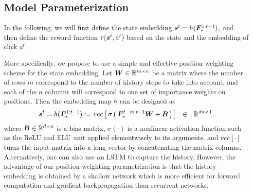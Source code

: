 \documentclass{article} %
\begin{document}
\subsection{Model Parameterization}
\vspace{-3mm}
In the following, we will first define the state embedding ${\bm{s}}^t = h({\bm{F}}^{1:t-1}_\ast)$, and then define the reward function $r({\bm{s}}^t, a^t)$ based on the state and the embedding of click $a^t$. 

More specifically, we propose to use a simple and effective position weighting scheme for the state embedding. Let ${\bm{W}} \in {\mathbb{R}}^{m\times n}$ be a matrix where the number of rows $m$ correspond to the number of history steps to take into account, and each of the $n$ columns will correspond to one set of importance weights on positions. Then the embedding map $h$ can be designed as 
{\small \begin{equation}
    \label{eq:state_embedding}
    {\bm{s}}^t = h({\bm{F}}^{1:t-1}_\ast) := vec \left[\, \sigma \left(\, {\bm{F}}_*^{t-m:t-1} {\bm{W}} + {\bm{B}} \,\right)\, \right]~~\in~~{\mathbb{R}}^{dn\times 1}, 
\end{equation}}
where ${\bm{B}}\in {\mathbb{R}}^{d\times n}$ is a bias matrix, $\sigma(\cdot)$ is a nonlinear activation function such as the ReLU and ELU unit applied elementwisely to its arguments, and $vec[\cdot]$ turns the input matrix into a long vector by concatenating the matrix columns.
Alternatively, one can also use an LSTM to capture the history. However, the advantage of our position weighting parametrization is that the history embedding is obtained by a shallow network which is more efficient for forward computation and gradient backpropagation than recurrent networks. 
\end{document}
